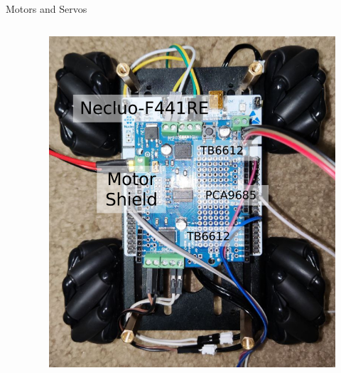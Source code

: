 \documentclass[12pt]{beamer}
\begin{document}
\begin{frame}{Motors and Servos}
\begin{columns}
\begin{column}{.65\linewidth}
\begin{itemize}
            \end{itemize}
        \end{column}
        \begin{column}{.3\linewidth}
            \begin{figure}[H]
                \centering
                \includegraphics[width=\textwidth]{motorshield.png}
            \end{figure}
        \end{column}
    \end{columns}

\end{frame}
\end{document}
